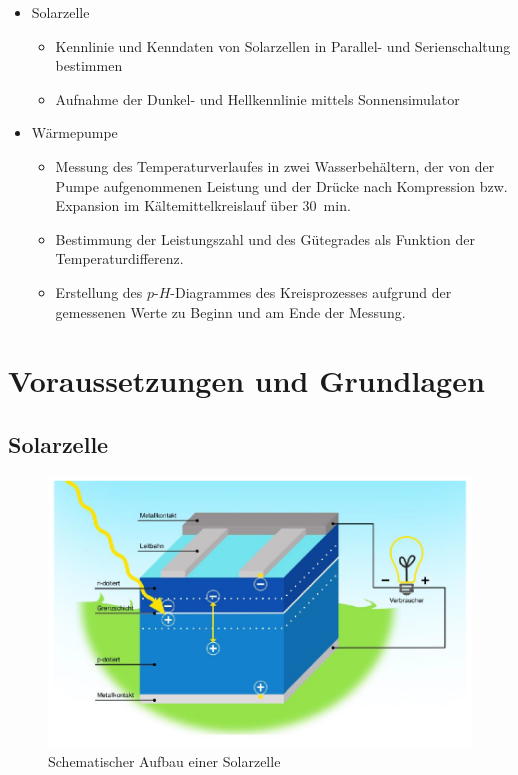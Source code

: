 \documentclass[english, ngerman]{scrartcl}
\begin{document}
\begin{itemize}
    \item Solarzelle
          \begin{itemize}
              \item Kennlinie und Kenndaten von Solarzellen in Parallel- und Serienschaltung bestimmen
              \item Aufnahme der Dunkel- und Hellkennlinie mittels Sonnensimulator
          \end{itemize}
    \item Wärmepumpe
          \begin{itemize}
              \item Messung des Temperaturverlaufes in zwei Wasserbehältern, der von der Pumpe aufgenommenen Leistung und der Drücke nach Kompression bzw. Expansion im Kältemittelkreislauf über \SI{30}{min}.
              \item Bestimmung der Leistungszahl und des Gütegrades als Funktion der Temperaturdifferenz.
              \item Erstellung des $p$-$H$-Diagrammes des Kreisprozesses aufgrund der gemessenen Werte zu Beginn und am Ende der Messung.
          \end{itemize}
\end{itemize}



\section[Voraussetzungen und Grundlagen]{Voraussetzungen und Grundlagen \cite{ref:angabe_solar,ref:angabe_waerme}}

\subsection{Solarzelle}
\label{subsec:grundlagen_solar}

\begin{figure}[H]
    \centering
    \begin{samepage}
        \includegraphics[width=0.7\linewidth]{fig/solarzelle_grundlagen.png}
        \caption{Schematischer Aufbau einer Solarzelle}
        \label{fig:solarzelle_schema}
    \end{samepage}
\end{figure}
\end{document}
